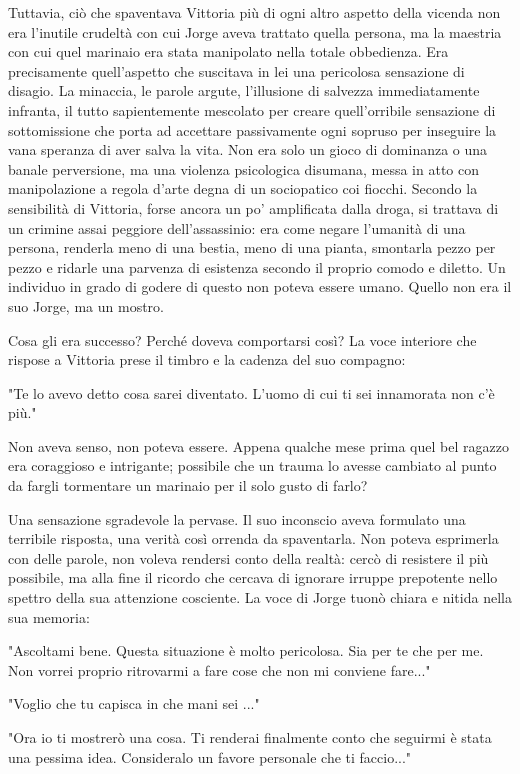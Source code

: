 Tuttavia, ciò che spaventava Vittoria più di ogni altro aspetto della vicenda non era l'inutile crudeltà con cui Jorge aveva trattato quella persona, ma la maestria con cui quel marinaio era stata manipolato nella totale obbedienza. Era precisamente quell'aspetto che suscitava in lei una pericolosa sensazione di disagio. La minaccia, le parole argute, l'illusione di salvezza immediatamente infranta, il tutto sapientemente mescolato per creare quell'orribile sensazione di sottomissione che porta ad accettare passivamente ogni sopruso per inseguire la vana speranza di aver salva la vita. Non era solo un gioco di dominanza o una banale perversione, ma una violenza psicologica disumana, messa in atto con manipolazione a regola d'arte degna di un sociopatico coi fiocchi. Secondo la sensibilità di Vittoria, forse ancora un po' amplificata dalla droga, si trattava di un crimine assai peggiore dell'assassinio: era come negare l'umanità di una persona, renderla meno di una bestia, meno di una pianta, smontarla pezzo per pezzo e ridarle una parvenza di esistenza secondo il proprio comodo e diletto. Un individuo in grado di godere di questo non poteva essere umano. Quello non era il suo Jorge, ma un mostro.

Cosa gli era successo? Perché doveva comportarsi così? La voce interiore che rispose a Vittoria prese il timbro e la cadenza del suo compagno:

"Te lo avevo detto cosa sarei diventato. L'uomo di cui ti sei innamorata non c'è più."

Non aveva senso, non poteva essere. Appena qualche mese prima quel bel ragazzo era coraggioso e intrigante; possibile che un trauma lo avesse cambiato al punto da fargli tormentare un marinaio per il solo gusto di farlo?

Una sensazione sgradevole la pervase. Il suo inconscio aveva formulato una terribile risposta, una verità così orrenda da spaventarla. Non poteva esprimerla con delle parole, non voleva rendersi conto della realtà: cercò di resistere il più possibile, ma alla fine il ricordo che cercava di ignorare irruppe prepotente nello spettro della sua attenzione cosciente. La voce di Jorge tuonò chiara e nitida nella sua memoria:

"Ascoltami bene. Questa situazione è molto pericolosa. Sia per te che per me. Non vorrei proprio ritrovarmi a fare cose che non mi conviene fare..."

"Voglio che tu capisca in che mani sei ..."

"Ora io ti mostrerò una cosa. Ti renderai finalmente conto che seguirmi è stata una pessima idea. Consideralo un favore personale che ti faccio..."

